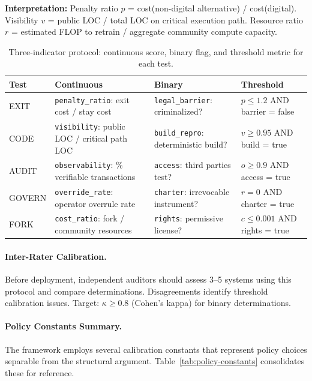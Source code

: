 \documentclass{article}
\begin{document}
\textbf{Interpretation:} Penalty ratio $p$ = cost(non-digital alternative) / cost(digital). Visibility $v$ = public LOC / total LOC on critical execution path. Resource ratio $r$ = estimated FLOP to retrain / aggregate community compute capacity.

\begin{table}[htbp]
\centering
\scriptsize
\caption{Three-indicator protocol: continuous score, binary flag, and threshold metric for each test.}
\label{tab:three-indicator-main}
\begin{tabular}{@{}lp{2.8cm}p{2.8cm}p{3.2cm}@{}}
\toprule
\textbf{Test} & \textbf{Continuous} & \textbf{Binary} & \textbf{Threshold} \\
\midrule
EXIT & \texttt{penalty\_ratio}: exit cost / stay cost & \texttt{legal\_barrier}: criminalized? & $p \leq 1.2$ AND barrier = false \\
CODE & \texttt{visibility}: public LOC / critical path LOC & \texttt{build\_repro}: deterministic build? & $v \geq 0.95$ AND build = true \\
AUDIT & \texttt{observability}: \% verifiable transactions & \texttt{access}: third parties test? & $o \geq 0.9$ AND access = true \\
GOVERN & \texttt{override\_rate}: operator overrule rate & \texttt{charter}: irrevocable instrument? & $r = 0$ AND charter = true \\
FORK & \texttt{cost\_ratio}: fork / community resources & \texttt{rights}: permissive license? & $c \leq 0.001$ AND rights = true \\
\bottomrule
\end{tabular}
\end{table}

\paragraph{Inter-Rater Calibration.} Before deployment, independent auditors should assess 3--5 systems using this protocol and compare determinations. Disagreements identify threshold calibration issues. Target: $\kappa \geq 0.8$ (Cohen's kappa) for binary determinations.

\paragraph{Policy Constants Summary.} The framework employs several calibration constants that represent policy choices separable from the structural argument. Table~\ref{tab:policy-constants} consolidates these for reference.
\end{document}
